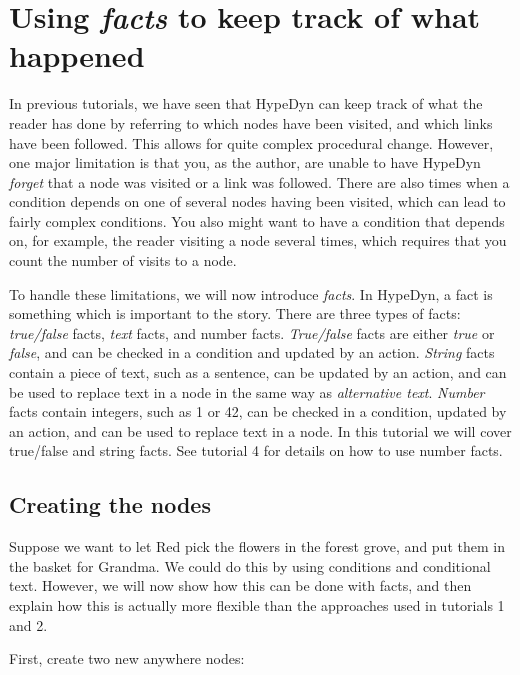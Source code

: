 \documentclass{article}
\begin{document}
\section{Using \textit{facts} to keep track of what happened}

In previous tutorials, we have seen that HypeDyn can keep track of what the reader has done by referring to which nodes have been visited, and which links have been followed. This allows for quite complex procedural change. However, one major limitation is that you, as the author, are unable to have HypeDyn \textit{forget} that a node was visited or a link was followed. There are also times when a condition depends on one of several nodes having been visited, which can lead to fairly complex conditions. You also might want to have a condition that depends on, for example, the reader visiting a node several times, which requires that you count the number of visits to a node.

To handle these limitations, we will now introduce \textit{facts}. In HypeDyn, a fact is something which is important to the story. There are three types of facts: \textit{true/false} facts, \textit{text} facts, and number facts. \textit{True/false} facts are either \textit{true} or \textit{false}, and can be checked in a condition and updated by an action. \textit{String} facts contain a piece of text, such as a sentence, can be updated by an action, and can be used to replace text in a node in the same way as \textit{alternative text}. \textit{Number} facts contain integers, such as 1 or 42, can be checked in a condition, updated by an action, and can be used to replace text in a node. In this tutorial we will cover true/false and string facts. See tutorial 4 for details on how to use number facts.

\subsection{Creating the nodes}

Suppose we want to let Red pick the flowers in the forest grove, and put them in the basket for Grandma. We could do this by using conditions and conditional text. However, we will now show how this can be done with facts, and then explain how this is actually more flexible than the approaches used in tutorials 1 and 2.

First, create two new anywhere nodes:
\end{document}
